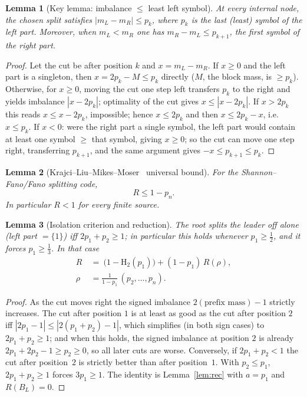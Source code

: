 \documentclass[journal]{IEEEtran}
\newtheorem{lemma}{Lemma}
\theoremstyle{definition}
\newcommand{\Hh}{\mathrm H_2}
\begin{document}
\begin{lemma}[Key lemma: imbalance $\le$ least left symbol]\label{lem:key}
At every internal node, the chosen split satisfies $|m_L-m_R|\le p_k$, where
$p_k$ is the last \textup{(}least\textup{)} symbol of the left part. Moreover, when
$m_L<m_R$ one has $m_R-m_L\le p_{k+1}$, the first symbol of the right part.
\end{lemma}

\begin{proof}
Let the cut be after position $k$ and $x=m_L-m_R$. If $x\ge0$ and the left part
is a singleton, then $x=2p_k-M\le p_k$ directly ($M$, the block mass, is
$\ge p_k$). Otherwise, for $x\ge0$, moving the cut one
step left transfers $p_k$ to the right and yields imbalance $|x-2p_k|$;
optimality of the cut gives $x\le|x-2p_k|$. If $x>2p_k$ this reads
$x\le x-2p_k$, impossible; hence $x\le2p_k$ and then $x\le2p_k-x$, i.e.\
$x\le p_k$. If $x<0$: were the right part a single symbol, the left part would
contain at least one symbol $\ge$ that symbol, giving $x\ge0$; so the cut can move
one step right, transferring $p_{k+1}$, and the same argument gives
$-x\le p_{k+1}\le p_k$.
\end{proof}

\begin{lemma}[Krajci--Liu--Mikes--Moser~\cite{Krajci15} universal bound]\label{lem:univ}
For the Shannon--Fano/Fano splitting code,
\[
  R\le1-p_n .
\]
In particular $R<1$ for every finite source.
\end{lemma}

\begin{lemma}[Isolation criterion and reduction]\label{lem:iso}
The root splits the leader off alone \textup{(}left part $=\{1\}$\textup{)} iff
$2p_1+p_2\ge1$; in particular this holds whenever $p_1\ge\tfrac12$, and it forces
$p_1\ge\tfrac13$. In that case
\[
\begin{aligned}
  R\ &=\ \bigl(1-\Hh(p_1)\bigr)+(1-p_1)\,R(\rho),\\
  \rho&=\tfrac{1}{1-p_1}\,(p_2,\dots,p_n).
\end{aligned}
\]
\end{lemma}

\begin{proof}
As the cut moves right the signed imbalance $2(\text{prefix mass})-1$ strictly
increases. The cut after position $1$ is at least as good as the cut after position $2$ iff
$|2p_1-1|\le|2(p_1+p_2)-1|$, which simplifies (in both sign cases) to
$2p_1+p_2\ge1$; and when this holds, the signed imbalance at position $2$ is
already $2p_1+2p_2-1\ge p_2\ge0$, so all later cuts are worse. Conversely, if
$2p_1+p_2<1$ the cut after position~$2$ is strictly better than after
position~$1$. With $p_2\le p_1$, $2p_1+p_2\ge1$ forces $3p_1\ge1$. The identity
is Lemma~\ref{lem:rec} with $a=p_1$ and $R(B_L)=0$.
\end{proof}
\end{document}
